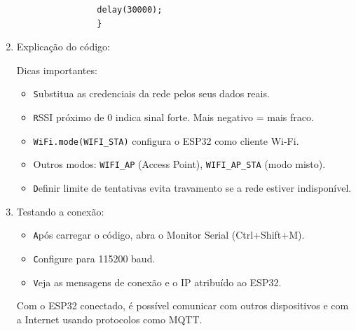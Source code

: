 \documentclass[a4paper]{article}
\begin{document}
\begin{answer}
\begin{enumerate}
\begin{verbatim}
                delay(30000);
                }
            \end{verbatim}
        
            \item Explicação do código:

                Dicas importantes:
                \begin{itemize}
                        \item \texttt Substitua as credenciais da rede pelos seus dados reais.
                        \item \texttt RSSI próximo de 0 indica sinal forte. Mais negativo = mais fraco.
                        \item \texttt{WiFi.mode(WIFI\_STA)} configura o ESP32 como cliente Wi-Fi.
                        \item Outros modos: \texttt{WIFI\_AP} (Access Point), \texttt{WIFI\_AP\_STA} (modo misto).
                        \item \texttt Definir limite de tentativas evita travamento se a rede estiver indisponível.
                    \end{itemize}

            \item Testando a conexão:
            
                \begin{itemize}
                    \item \texttt Após carregar o código, abra o Monitor Serial (Ctrl+Shift+M).
                    \item \texttt Configure para 115200 baud.
                    \item \texttt Veja as mensagens de conexão e o IP atribuído ao ESP32.
                \end{itemize}

            Com o ESP32 conectado, é possível comunicar com outros dispositivos e com a Internet usando protocolos como MQTT.
        \end{enumerate}
    \end{answer}
\end{document}

